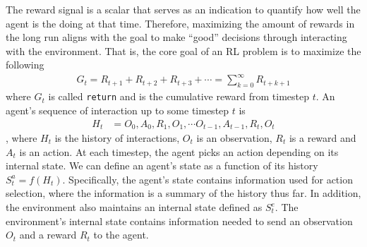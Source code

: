 \documentclass[12pt]{report}
\begin{document}
The reward signal is a scalar that serves as an indication to quantify how well the agent is the doing at that time. Therefore, maximizing the amount of rewards in the long run aligns with the goal to make ``good'' decisions through interacting with the environment. That is, the core goal of an RL problem is to maximize the following
\begin{align}
    G_t = R_{t+1} + R_{t+2} + R_{t+3} + \cdots = \sum_{k=0}^\infty R_{t+k+1} \label{eq:gamma1-return}
\end{align}
where $G_t$ is called \texttt{return} and is the cumulative reward from timestep $t$. An agent's sequence of interaction up to some timestep $t$ is
\begin{align}
    H_t &= O_0, A_0, R_1, O_1, \cdots O_{t-1}, A_{t-1}, R_t, O_t\nonumber
\end{align}
, where $H_t$ is the history of interactions, $O_t$ is an observation, $R_t$ is a reward and $A_t$ is an action. At each timestep, the agent picks an action depending on its internal state. We can define an agent's state as a function of its history $S_t^a = f(H_t)$. Specifically, the agent's state contains information used for action selection, where the information is a summary of the history thus far. In addition, the environment also maintains an internal state defined as $S_t^e$. The environment's internal state contains information needed to send an observation $O_t$ and a reward $R_t$ to the agent.\\
\end{document}
